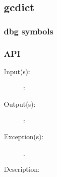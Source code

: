 %
%
%
%
%              

\subsection{gcdict}
\label{gcdict}

\subsubsection{dbg symbols}

\subsubsection{API}
\begin{description}
\label{gcdict_}
\item[{\cfunc[]{gcdict\_}{}}: ]
	\begin{description}\item[]
	\item[Input(s): ]
		\begin{description}\item[]
		\item[: ]
		\end{description}
	\item[Output(s): ]
		\begin{description}\item[]
		\item[: ]
		\end{description}
	\item[Exception(s): ]
		\begin{description}\item[]
		\item[.]
		\end{description}
	\item[Description: ]
	\end{description}
\end{description}
